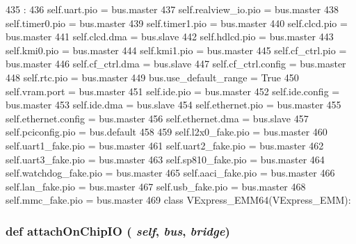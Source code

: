 \begin{DoxyCode}
435                            :
436        self.uart.pio            = bus.master
437        self.realview_io.pio     = bus.master
438        self.timer0.pio          = bus.master
439        self.timer1.pio          = bus.master
440        self.clcd.pio            = bus.master
441        self.clcd.dma            = bus.slave
442        self.hdlcd.pio           = bus.master
443        self.kmi0.pio            = bus.master
444        self.kmi1.pio            = bus.master
445        self.cf_ctrl.pio         = bus.master
446        self.cf_ctrl.dma         = bus.slave
447        self.cf_ctrl.config      = bus.master
448        self.rtc.pio             = bus.master
449        bus.use_default_range    = True
450        self.vram.port           = bus.master
451        self.ide.pio             = bus.master
452        self.ide.config          = bus.master
453        self.ide.dma             = bus.slave
454        self.ethernet.pio        = bus.master
455        self.ethernet.config     = bus.master
456        self.ethernet.dma        = bus.slave
457        self.pciconfig.pio       = bus.default
458 
459        self.l2x0_fake.pio       = bus.master
460        self.uart1_fake.pio      = bus.master
461        self.uart2_fake.pio      = bus.master
462        self.uart3_fake.pio      = bus.master
463        self.sp810_fake.pio      = bus.master
464        self.watchdog_fake.pio   = bus.master
465        self.aaci_fake.pio       = bus.master
466        self.lan_fake.pio        = bus.master
467        self.usb_fake.pio        = bus.master
468        self.mmc_fake.pio        = bus.master
469 
class VExpress_EMM64(VExpress_EMM):
\end{DoxyCode}
\hypertarget{classRealView_1_1VExpress__EMM_abd74cec934f25d2881d5fdd0d5e7f512}{
\subsubsection[{attachOnChipIO}]{\setlength{\rightskip}{0pt plus 5cm}def attachOnChipIO ( {\em self}, \/   {\em bus}, \/   {\em bridge})}}
\label{classRealView_1_1VExpress__EMM_abd74cec934f25d2881d5fdd0d5e7f512}



